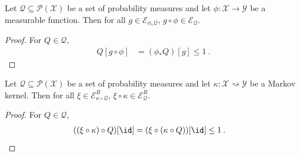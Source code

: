 
%











\begin{lemma}\label{lem:eVar_comp}
  \leanok
Let $\mathcal{Q} \subseteq \mathcal{P}(\mathcal{X})$ be a set of probability measures and let $\phi : \mathcal{X} \to \mathcal{Y}$ be a measurable function.
Then for all $g \in \mathcal{E}_{\phi_* \mathcal{Q}}$, $g \circ \phi \in \mathcal{E}_{\mathcal{Q}}$.
\end{lemma}

\begin{proof}\leanok
For $Q \in \mathcal{Q}$,
\begin{align*}
  Q[g \circ \phi]
  &= (\phi_* Q)[g]
  \le 1
  \: .
\end{align*}
\end{proof}


\begin{lemma}\label{lem:randEVar_comp}
  \leanok
Let $\mathcal{Q} \subseteq \mathcal{P}(\mathcal{X})$ be a set of probability measures and let $\kappa : \mathcal{X} \rightsquigarrow \mathcal{Y}$ be a Markov kernel.
Then for all $\xi \in \mathcal{E}_{\kappa \circ \mathcal{Q}}^R$, $\xi \circ \kappa \in \mathcal{E}^R_{\mathcal{Q}}$.
\end{lemma}

\begin{proof}\leanok
For $Q \in \mathcal{Q}$,
\begin{align*}
  ((\xi \circ \kappa) \circ Q)[\id]
  &= (\xi \circ (\kappa \circ Q))[\id]
  \le 1
  \: .
\end{align*}
\end{proof}


